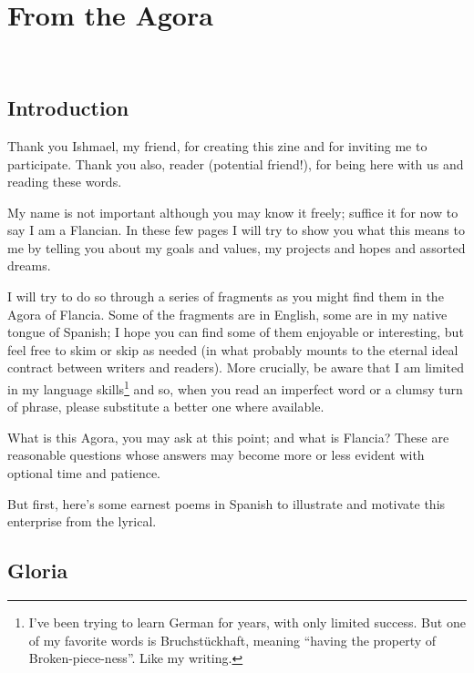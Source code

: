 
\section{From the Agora}
\\

\subsection*{Introduction}

Thank you Ishmael, my friend, for creating this zine and for inviting me to participate. Thank you also, reader (potential friend!), for being here with us and reading these words.

My name is not important although you may know it freely; suffice it for now to say I am a Flancian. In these few pages I will try to show you what this means to me by telling you about my goals and values, my projects and hopes and assorted dreams. 

I will try to do so through a series of fragments as you might find them in the Agora of Flancia. Some of the fragments are in English, some are in my native tongue of Spanish; I hope you can find some of them enjoyable or interesting, but feel free to skim or skip as needed (in what probably mounts to the eternal ideal contract between writers and readers). More crucially, be aware that I am limited in my language skills\footnote{I’ve been trying to learn German for years, with only limited success. But one of my favorite words
is Bruchstückhaft, meaning “having the property of Broken-piece-ness”. Like my writing.} and so, when you read an imperfect word or a clumsy turn of phrase, please substitute a better one where available.

What is this Agora, you may ask at this point; and what is Flancia? These are reasonable questions whose answers may become more or less evident with optional time and patience.

But first, here's some earnest poems in Spanish to illustrate and motivate this enterprise from the lyrical.

\fleurona

\subsection*{Gloria}


